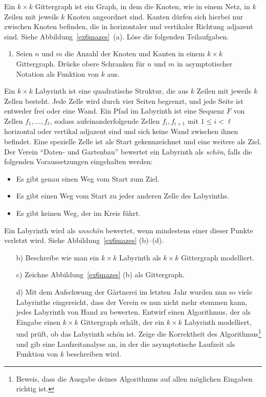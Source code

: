 \documentclass{uebung_cs}
\begin{document}
\begin{aufgabe}
	Ein $k\times k$ Gittergraph ist ein Graph, in dem die Knoten, wie in einem Netz, in $k$ Zeilen mit jeweils $k$ Knoten angeordnet sind.
	Kanten dürfen sich hierbei nur zwischen Knoten befinden, die in horizontaler und vertikaler Richtung adjazent sind.
	Siehe Abbildung~\ref{ex6mazes}~(a).
	Löse die folgenden Teilaufgaben.
	\begin{enumerate}
		\item Seien $n$ und $m$ die Anzahl der Knoten und Kanten in einem $k\times k$ Gittergraph.
		Drücke obere Schranken für $n$ und $m$ in asymptotischer Notation als Funktion von $k$ aus.
	\end{enumerate}
	Ein $k\times k$ Labyrinth ist eine quadratische Struktur, die aus $k$ Zeilen mit jeweils $k$ Zellen besteht.
	Jede Zelle wird durch vier Seiten begrenzt, und jede Seite ist entweder frei oder eine Wand.
	Ein Pfad im Labyrinth ist eine Sequenz $F$ von Zellen $f_1,\ldots, f_\ell$, sodass aufeinanderfolgende Zellen $f_i, f_{i+1}$ mit $1 \leq i < \ell$ horizontal oder vertikal adjazent sind und sich keine Wand zwischen ihnen befindet.
	Eine spezielle Zelle ist als Start gekennzeichnet und eine weitere als Ziel.\\
	Der Verein \enquote{Daten- und Gartenbau} bewertet ein Labyrinth als \textit{schön}, falls die folgenden Voraussetzungen eingehalten werden:
	\begin{itemize}
		\item Es gibt genau einen Weg vom Start zum Ziel.
		\item Es gibt einen Weg vom Start zu jeder anderen Zelle des Labyrinths.
		\item Es gibt keinen Weg, der im Kreis führt.
	\end{itemize}
	Ein Labyrinth wird als \textit{unschön} bewertet, wenn mindestens einer dieser Punkte verletzt wird.
	Siehe Abbildung~\ref{ex6mazes} (b)--(d).
	\begin{enumerate}
		\item[b)] Beschreibe wie man ein $k\times k$ Labyrinth als $k\times k$ Gittergraph modelliert.
		\item[c)] Zeichne Abbildung~\ref{ex6mazes} (b) als Gittergraph.
		\item[d)] Mit dem Aufschwung der Gärtnerei im letzten Jahr wurden nun so viele Labyrinthe eingereicht, dass der Verein es nun nicht mehr stemmen kann, jedes Labyrinth von Hand zu bewerten.
		Entwirf einen Algorithmus, der als Eingabe einen $k\times k$ Gittergraph erhält, der ein $k\times k$ Labyrinth modelliert, und prüft, ob das Labyrinth schön ist.
		Zeige die Korrektheit des Algorithmus\footnote{Beweis, dass die Ausgabe deines Algorithmus auf allen möglichen Eingaben richtig ist.} und gib eine Laufzeitanalyse an, in der die asymptotische Laufzeit als Funktion von $k$ beschreiben wird.
	\end{enumerate}
\end{aufgabe}
\end{document}
